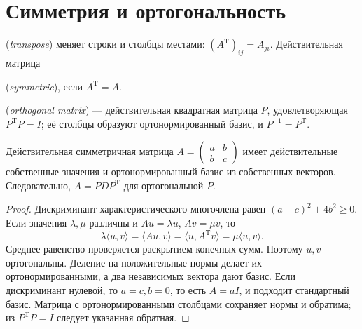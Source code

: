\section{Симметрия и ортогональность}
\begin{definition} (\emph{transpose}) меняет строки и столбцы местами: \((A^{\mathrm T})_{ij}=A_{ji}\). Действительная матрица \par {} (\emph{symmetric}), если \(A^{\mathrm T}=A\).\end{definition}
\begin{definition} (\emph{orthogonal matrix}) — действительная квадратная матрица \(P\), удовлетворяющая \(P^{\mathrm T}P=I\); её столбцы образуют ортонормированный базис, и \(P^{-1}=P^{\mathrm T}\).\end{definition}
\begin{theorem}\label{thm:legacy-c27-4}
Действительная симметричная матрица \(A=\begin{pmatrix}a&b\\b&c\end{pmatrix}\) имеет действительные собственные значения и ортонормированный базис из собственных векторов. Следовательно, \(A=PDP^{\mathrm T}\) для ортогональной \(P\).
\end{theorem}
\begin{proof}
Дискриминант характеристического многочлена равен \((a-c)^2+4b^2\ge0\). Если значения \(\lambda,\mu\) различны и \(Au=\lambda u\), \(Av=\mu v\), то
\[
\lambda\langle u,v\rangle=\langle Au,v\rangle
=\langle u,A^{\mathrm T}v\rangle=\mu\langle u,v\rangle.
\]
Среднее равенство проверяется раскрытием конечных сумм. Поэтому \(u,v\) ортогональны. Деление на положительные нормы делает их ортонормированными, а два независимых вектора дают базис. Если дискриминант нулевой, то \(a=c,b=0\), то есть \(A=aI\), и подходит стандартный базис. Матрица с ортонормированными столбцами сохраняет нормы и обратима; из \(P^{\mathrm T}P=I\) следует указанная обратная.
\end{proof}

